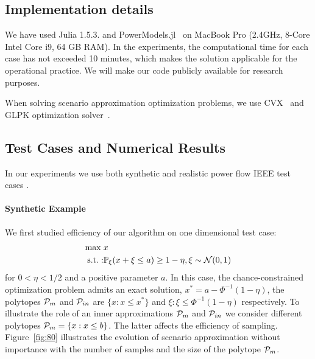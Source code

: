 \documentclass{IEEEtran4PSCC}
\DeclareMathOperator*{\st}{s.t.:}
\newcommand{\cP}{{\cal P}}
\newcommand{\cN}{{\cal N}}
\begin{document}
\subsection{Implementation details} We have used Julia 1.5.3. and PowerModels.jl~\cite{coffrin2018powermodels} on MacBook Pro (2.4GHz, 8-Core Intel Core i9, 64 GB RAM). In the experiments, the computational time for each case has not exceeded 10 minutes, which makes the solution applicable for the operational practice. We will make our code publicly available for research purposes. 

When solving scenario approximation optimization problems, we use CVX~\cite{diamond2016cvxpy} and GLPK optimization solver~\cite{GLPK}. 

\subsection{Test Cases and Numerical Results}

In our experiments we use both synthetic and realistic power flow IEEE test cases \cite{thurner2018pandapower}. 

\paragraph{Synthetic Example}
We first studied efficiency of our algorithm on one dimensional test case:
\begin{align*}
  \max\; & x\\
  \st & \mathbb{P}_\xi(x+\xi \le a) \ge 1-\eta, \xi\sim \cN(0,1)
\end{align*}
for $0 < \eta < 1/2$ and a positive parameter $a$. In this case, the chance-constrained optimization problem admits an exact solution, $x^* = a - \Phi^{-1}(1-\eta)$, the polytopes $\cP_{m}$ and $\cP_{in}$ are $\{x: x\le x^*\}$ and $\xi: \xi \leq \Phi^{-1}(1-\eta)$ respectively. To illustrate the role of an inner approximations $\cP_{m}$ and $\cP_{in}$ we consider different polytopes $\cP_{m} = \{x: x\le b\}$. The latter affects the efficiency of sampling. Figure~\ref{fig:80} illustrates the evolution of scenario approximation without importance with the number of samples and the size of the polytope $\cP_m$.


\end{document}
